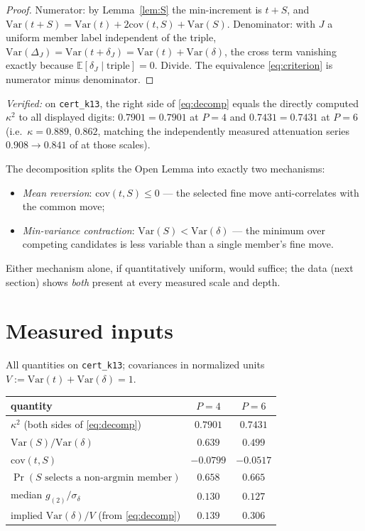 \documentclass[11pt]{article}
\theoremstyle{definition}
\theoremstyle{remark}
\newcommand{\E}{\mathbb{E}}
\newcommand{\Var}{\mathrm{Var}}
\newcommand{\cov}{\mathrm{cov}}
\newcommand{\kap}{\kappa}
\newcommand{\dl}{\delta}
\begin{document}
\begin{proof}
Numerator: by Lemma~\ref{lem:S} the min-increment is $t + S$, and
$\Var(t+S) = \Var(t) + 2\cov(t,S) + \Var(S)$. Denominator: with $J$ a
uniform member label independent of the triple,
$\Var(\Delta_J) = \Var(t + \dl_J) = \Var(t) + \Var(\dl)$, the cross term
vanishing exactly because $\E[\dl_J \mid \mathrm{triple}] = 0$.
Divide. The equivalence \eqref{eq:criterion} is numerator minus
denominator.
\end{proof}

\emph{Verified:} on \texttt{cert\_k13}, the right side of
\eqref{eq:decomp} equals the directly computed $\kap^2$ to all displayed
digits: $0.7901 = 0.7901$ at $P = 4$ and $0.7431 = 0.7431$ at $P = 6$
(i.e.\ $\kap = 0.889$, $0.862$, matching the independently measured
attenuation series $0.908 \to 0.841$ of \cite{Drift26} at those scales).

The decomposition splits the Open Lemma into exactly two mechanisms:
\begin{itemize}
\item[(M1)] \emph{Mean reversion}: $\cov(t,S) \leq 0$ --- the selected
fine move anti-correlates with the common move;
\item[(M2)] \emph{Min-variance contraction}: $\Var(S) < \Var(\dl)$ ---
the minimum over competing candidates is less variable than a single
member's fine move.
\end{itemize}
Either mechanism alone, if quantitatively uniform, would suffice; the
data (next section) shows \emph{both} present at every measured scale
and depth.

\section{Measured inputs}
\label{sec:measured}

All quantities on \texttt{cert\_k13}; covariances in normalized units
$V := \Var(t) + \Var(\dl) = 1$.

\begin{center}
\begin{tabular}{l c c}
\hline
quantity & $P = 4$ & $P = 6$ \\
\hline
$\kap^2$ (both sides of \eqref{eq:decomp}) & $0.7901$ & $0.7431$ \\
$\Var(S)/\Var(\dl)$ & $0.639$ & $0.499$ \\
$\cov(t,S)$ & $-0.0799$ & $-0.0517$ \\
$\Pr(S \text{ selects a non-argmin member})$ & $0.658$ & $0.665$ \\
median $g_{(2)} / \sigma_\dl$ & $0.130$ & $0.127$ \\
implied $\Var(\dl)/V$ (from \eqref{eq:decomp}) & $0.139$ & $0.306$ \\
\hline
\end{tabular}
\end{center}
\end{document}
